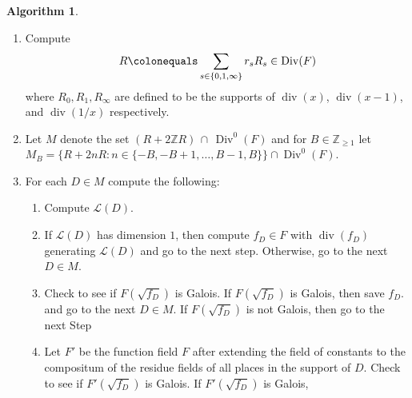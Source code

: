 \documentclass{dcthesis}
\newcommand{\ZZ}{\mathbb Z}
\newcommand{\wt}[1]{\widetilde{#1}}
\DeclareMathOperator{\Div}{Div}
\DeclareMathOperator{\ddiv}{div}
\DeclareMathOperator{\order}{order}
\numberwithin{equation}{section}
\theoremstyle{definition}
\newtheorem{alg}[equation]{Algorithm}
\theoremstyle{remark}
\begin{document}
{{{\begin{alg}
\begin{enumerate}
\begin{align}
\begin{cases}
              \order(\wt{\sigma}_s)\\
              1&
              \text{ if }
              \order(\sigma_s)<
              \order(\wt{\sigma}_s)\\
            \end{cases}
          \end{align}
        \item\label{alg:charzero_getram}
          Compute
          \begin{equation}
            \label{eqn:ramdivisor}
            R\colonequals
            \sum_{s\in\{0,1,\infty\}}r_sR_s
            \in\Div(F)
          \end{equation}
          where
          $R_0,R_1,R_\infty$
          are defined to be the supports
          of
          $\ddiv(x)$,
          $\ddiv(x-1)$,
          and $\ddiv(1/x)$
          respectively.
        \item
          \label{alg:charzero_alldegreezero}
          Let $M$ denote the set
          $(R+2\ZZ R)\,\cap\,\Div^0(F)$
          and for $B\in\ZZ_{\geq 1}$
          let $M_B=
          \Big\{R+2nR : n\in 
          \{-B,-B+1,\dots,B-1,B\}\Big\}
          \cap\Div^0(F)$.
        \item
          For each $D\in M$ compute the
          following:
          \begin{enumerate}
            \item
              Compute $\mathscr{L}(D)$.
            \item
              If $\mathscr{L}(D)$
              has dimension
              $1$, then compute
              $f_D\in F$ with $\ddiv(f_D)$
              generating $\mathscr{L}(D)$
              and go to the next step.
              Otherwise,
              go to the next $D\in M$.
            \item\label{alg:charzero_isgal}
              Check to see if
              $F(\sqrt{f_D})$ is Galois.
              If $F(\sqrt{f_D})$ is Galois,
              then save $f_D$.
              and go to the next $D\in M$.
              If $F(\sqrt{f_D})$ is not Galois,
              then go to the next Step
            \item\label{alg:charzero_isgalext}
              Let $F'$ be the function field
              $F$ after extending the field of
              constants to the compositum
              of the residue fields of
              all places in the support of $D$.
              Check to see if
              $F'(\sqrt{f_D})$ is Galois.
              If $F'(\sqrt{f_D})$ is Galois,

\end{enumerate}
\end{enumerate}
\end{alg}}}}
\end{document}
